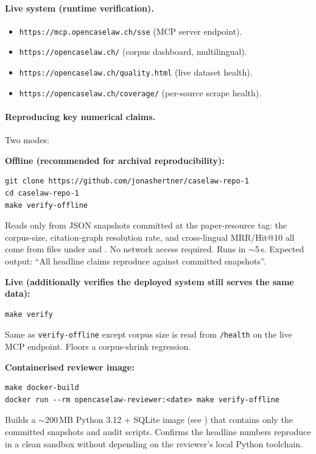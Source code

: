 \paragraph{Live system (runtime verification).}
\begin{itemize}
\item \texttt{https://mcp.opencaselaw.ch/sse} (MCP server endpoint).
\item \texttt{https://opencaselaw.ch/} (corpus dashboard, multilingual).
\item \texttt{https://opencaselaw.ch/quality.html} (live dataset health).
\item \texttt{https://opencaselaw.ch/coverage/} (per-source scrape health).
\end{itemize}

\paragraph{Reproducing key numerical claims.} Two modes:

\textbf{Offline (recommended for archival reproducibility):}
\begin{verbatim}
git clone https://github.com/jonashertner/caselaw-repo-1
cd caselaw-repo-1
make verify-offline
\end{verbatim}
Reads only from JSON snapshots committed at the paper-resource tag:
the corpus-size, citation-graph resolution rate, and cross-lingual
MRR/Hit@10 all come from files under  and
. No network access
required. Runs in $\sim$5\,s. Expected output: ``All headline claims
reproduce against committed snapshots''.

\textbf{Live (additionally verifies the deployed system still serves
the same data):}
\begin{verbatim}
make verify
\end{verbatim}
Same as \texttt{verify-offline} except corpus size is read from
\texttt{/health} on the live MCP endpoint. Floors a corpus-shrink
regression.

\textbf{Containerised reviewer image:}
\begin{verbatim}
make docker-build
docker run --rm opencaselaw-reviewer:<date> make verify-offline
\end{verbatim}
Builds a $\sim$200\,MB Python 3.12 + SQLite image (see
) that contains only the committed snapshots
and audit scripts. Confirms the headline numbers reproduce in a clean
sandbox without depending on the reviewer's local Python toolchain.

